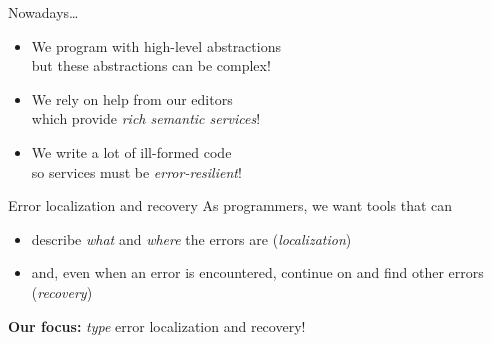 \begin{frame}{Nowadays\ldots}
  \begin{itemize}
    \item We program with high-level abstractions \\ \pause
      but these abstractions can be complex!

      \pause
    \item We rely on help from our editors \\ \pause
      which provide \emph{rich semantic services}!

      \pause
    \item We write a lot of ill-formed code \\ \pause
      so services must be \emph{error-resilient}!
  \end{itemize}
\end{frame}

\begin{frame}{Error localization and recovery}
  As programmers, we want tools that can

  \pause
  \vspace{1em}
  \begin{itemize}
    \item describe \emph{what} and \emph{where} the errors are \pause (\emph{localization})

      \pause
    \item and, even when an error is encountered,
      continue on and find other errors \pause (\emph{recovery})
  \end{itemize}

  \vspace{1em}
  \pause
  \textbf{Our focus:} \emph{type} error localization and recovery!
\end{frame}

